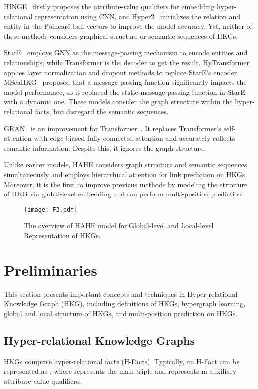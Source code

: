 \documentclass[11pt]{article}
\begin{document}
HINGE~\citep{HINGE} firstly proposes the attribute-value qualifiers for embedding hyper-relational representation using CNN, and Hyper2~\citep{Hyper2} initializes the relation and entity in the Poincar\'e ball vectors to improve the model accuracy. Yet, neither of these methods considers graphical structure or semantic sequences of HKGs.

StarE~\citep{StarE} employs GNN as the message-passing mechanism to encode entities and relationships, while Transformer is the decoder to get the result. HyTransformer~\cite{HyTransformer} applies layer normalization and dropout methods to replace StarE's encoder. MSeaHKG~\citep{MSeaHKG} proposed that a message-passing function significantly impacts the model performance, so it replaced the static message-passing function in StarE with a dynamic one. These models consider the graph structure within the hyper-relational facts, but disregard the semantic sequences.

GRAN~\citep{GRAN} is an improvement for Transformer~\citep{Transformer}. It replaces Transformer's self-attention with edge-biased fully-connected attention and accurately collects semantic information. Despite this, it ignores the graph structure.

Unlike earlier models, HAHE considers graph structure and semantic sequences simultaneously and employs hierarchical attention for link prediction on HKGs. Moreover, it is the first to improve previous methods by modeling the structure of HKG via global-level embedding and can perform multi-position prediction. 


\begin{figure*}[h!t]
\centering
\texttt{[image: F3.pdf]}
\caption{The overview of HAHE model for Global-level and Local-level Representation of HKGs.}
\label{HAHE}
\end{figure*}

\section{Preliminaries}

This section presents important concepts and techniques in Hyper-relational Knowledge Graph (HKG), including definitions of HKGs, hypergraph learning, global and local structure of HKGs, and multi-position prediction on HKGs.

\subsection{Hyper-relational Knowledge Graphs} 
HKGs comprise hyper-relational facts (H-Facts). Typically, an H-Fact can be represented as , where  represents the main triple and  represents m auxiliary attribute-value qualifiers. 
\end{document}
